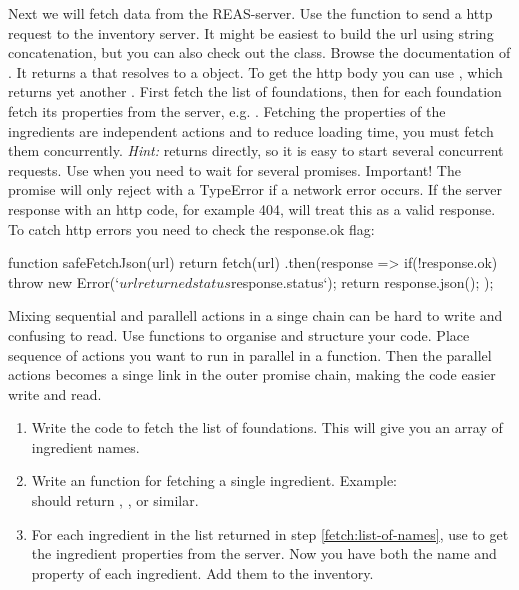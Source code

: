 \documentclass[fleqn, article, a4paper]{memoir}
\begin{document}
\begin{Assignments}
\item Next we will fetch data from the REAS-server. Use the  function to send a http request to the inventory server. It might be easiest to build the url using string concatenation, but you can also check out the  class. Browse the documentation of . It returns a  that resolves to a  object. To get the http body you can use , which returns yet another . First fetch the list of foundations, then for each foundation fetch its properties from the server, e.g. . Fetching the properties of the ingredients are independent actions and to reduce loading time, you must fetch them concurrently. \emph{Hint:}  returns directly, so it is easy to start several concurrent requests. Use  when you need to wait for several promises. Important! The   promise will only reject with a TypeError if a network error occurs. If the server response with an http code, for example 404,  will treat this as a valid response. To catch http errors you need to check the response.ok flag:
\begin{Code}
function safeFetchJson(url) {
  return fetch(url)
  .then(response => {
    if(!response.ok) {
      throw new Error(`${url} returned status ${response.status}`);
    }
    return response.json();
  });
}
\end{Code}
Mixing sequential and parallell actions in a singe  chain can be hard to write and confusing to read. Use functions to organise and structure your code. Place sequence of actions you want to run in parallel in a function. Then the parallel actions becomes a singe link in the outer promise chain, making the code easier write and read. 
\begin{enumerate}
\item \label{fetch:list-of-names}Write the code to fetch the list of foundations. This will give you an array of ingredient names.
\item Write an  function for fetching a single ingredient. Example:\\  should return , , or similar.
\item \label{fetch:build-category} For each ingredient in the list returned in step \ref{fetch:list-of-names}, use  to get the ingredient properties from the server. Now you have both the name and property of each ingredient. Add them to the inventory.

\end{enumerate}
\end{Assignments}
\end{document}
